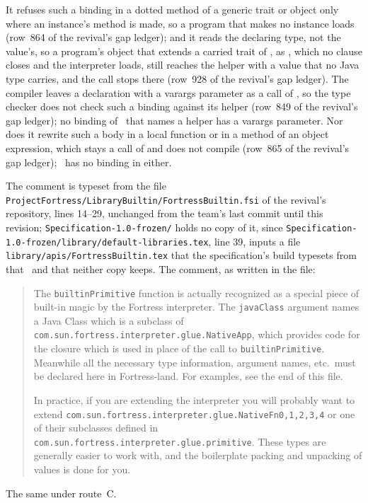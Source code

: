 \begin{description}
It refuses such a binding in a dotted method of a generic trait or object only
where an instance's method is made, so a program that makes no instance loads
(row~864 of the revival's gap ledger); and it reads the declaring type, not the
value's, so a program's object that extends a carried trait of \library, as
, which no  clause closes and the
interpreter loads, still reaches the helper with a value that no Java type
carries, and the call stops there (row~928 of the revival's gap ledger).
The compiler leaves a declaration with a varargs parameter as a call of
, so the type checker does not check such a binding
against its helper (row~849 of the revival's gap ledger); no binding of
\library\ that names a helper has a varargs parameter.
Nor does it rewrite such a body in a local function or in a method of an object
expression, which stays a call of  and does not compile
(row~865 of the revival's gap ledger); \library\ has no binding in either.
\item[Original text] The comment is typeset from the file
\nolinkurl{ProjectFortress/LibraryBuiltin/FortressBuiltin.fsi} of the revival's
repository, lines 14--29, unchanged from the team's last commit until this
revision; \nolinkurl{Specification-1.0-frozen/} holds no copy of it, since
\nolinkurl{Specification-1.0-frozen/library/default-libraries.tex}, line 39,
inputs a file \nolinkurl{library/apis/FortressBuiltin.tex} that the
specification's build typesets from that \apiN\ and that neither copy keeps.
The comment, as written in the file:
\begin{quote}
The \texttt{builtinPrimitive} function is actually recognized as a special
piece of built-in magic by the Fortress interpreter.  The \texttt{javaClass}
argument names a Java Class which is a subclass of
\texttt{com.sun.fortress.interpreter.glue.NativeApp}, which provides code
for the closure which is used in place of the call to
\texttt{builtinPrimitive}.  Meanwhile all the necessary type information,
argument names, etc.\ must be declared here in Fortress-land.  For
examples, see the end of this file.

In practice, if you are extending the interpreter you will probably
want to extend \texttt{com.sun.fortress.interpreter.glue.NativeFn0,1,2,3,4}
or one of their subclasses defined in
\texttt{com.sun.fortress.interpreter.glue.primitive}.  These types are
generally easier to work with, and the boilerplate packing and
unpacking of values is done for you.
\end{quote}
\item[Route C] The same under route~C.
\end{description}

